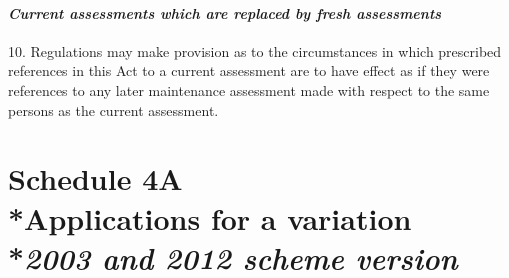 \documentclass[12pt,a4paper]{article}
\begin{document}

%
%
%
%

\subsection*{\itshape Current assessments which are replaced by fresh assessments}

10. Regulations may make provision as to the circumstances in which prescribed references in this Act to a current assessment are to have effect as if they were references to any later maintenance assessment made with respect to the same persons as the current assessment.

\part[Schedule 4A --- Applications for a variation --- \emph{2003 and 2012 scheme version}]{\noindent S\lowercase{CHEDULE} 4A\\*Applications for a variation\\*\emph{2003 and 2012 scheme version}}
\end{document}
